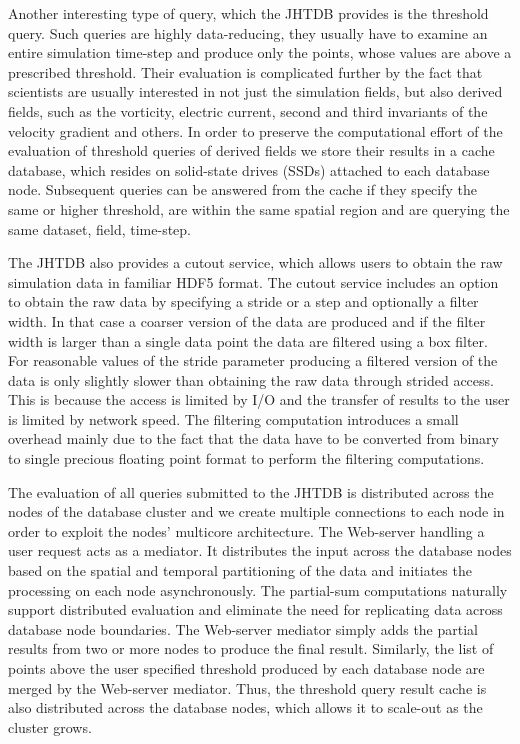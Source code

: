 \documentclass[10pt,twocolumn]{article}
\begin{document}
Another interesting type of query, which the JHTDB provides is the threshold query. Such queries are highly data-reducing, they usually have to examine an
entire simulation time-step and produce only the points, whose values are above a prescribed threshold. Their evaluation is complicated further by the fact
that scientists are usually interested in not just the simulation fields, but also derived fields, such as the vorticity, electric current, second and third invariants
of the velocity gradient and others. In order to preserve the computational effort of the evaluation of threshold queries of derived fields we store their results
in a cache database, which resides on solid-state drives (SSDs) attached to each database node. Subsequent queries can be answered from the cache
if they specify the same or higher threshold, are within the same spatial region and are querying the same dataset, field, time-step.

The JHTDB also provides a cutout service, which allows users to obtain the raw simulation data in familiar HDF5 format. The cutout service includes an
option to obtain the raw data by specifying a stride or a step and optionally a filter width. 
In that case a coarser version of the data are produced and if the filter width is larger than a single data point the data are filtered using a box filter. 
For reasonable values of the stride parameter producing a filtered version of the data is only slightly slower than obtaining the raw data through strided access.  
This is because the access is limited by I/O and the transfer of results to the user is limited by network speed. 
The filtering computation introduces a small overhead mainly due to the fact that the data have to be converted
from binary to single precious floating point format to perform the filtering computations.

The evaluation of all queries submitted to the JHTDB is distributed across the nodes of the database cluster and we create multiple connections to each
node in order to exploit the nodes' multicore architecture. The Web-server handling a user request acts as a mediator. It distributes the input across the
database nodes based on the spatial and temporal partitioning of the data and initiates the processing on each node asynchronously. The partial-sum
computations naturally support distributed evaluation and eliminate the need
for replicating data across database node boundaries. The Web-server mediator simply adds the partial results from two or more nodes to produce the
final result. Similarly, the list of points above the user specified threshold produced by each database node are merged by the Web-server mediator. 
Thus, the threshold query result cache is also distributed across the database nodes, which allows it to scale-out as the cluster grows.
\end{document}
